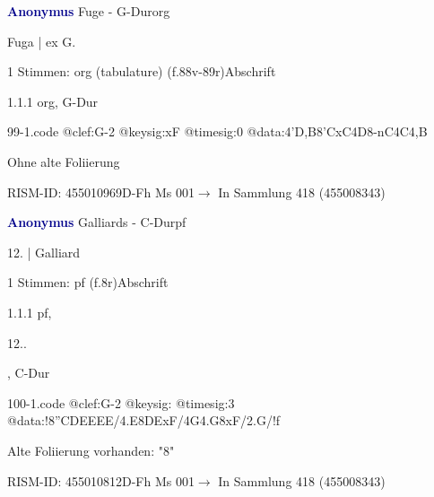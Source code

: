 \documentclass[twocolumn, 12pt]{book}
\begin{document}
\par \vspace{16pt} \textcolor{darkblue}{\textbf{Anonymus  }}\hfillplus{\textbf{[99]}}\newline Fuge - G-Dur\newline org
\par \begin{itshape}[f.88v, at left:] Fuga | ex G.\end{itshape} 
\par \textcolor{darkblue}{}  1 Stimmen: org (tabulature)  (f.88v-89r)\newline Abschrift
\par 1.1.1  org, G-Dur  
\begin{filecontents*}{99-1.code}
@clef:G-2
@keysig:xF
@timesig:0
@data:4'D,B{8'CxC}4D8-nC4C4,B
\end{filecontents*}
\newline %
\par Ohne alte Foliierung
\par RISM-ID: 455010969\newline D-Fh  Ms 001\newline $\rightarrow$ In Sammlung 418 (455008343)
      
\par \vspace{16pt} \textcolor{darkblue}{\textbf{Anonymus  }}\hfillplus{\textbf{[100]}}\newline Galliards - C-Dur\newline pf
\par \begin{itshape}[f.8r, at left:] 12. | Galliard\end{itshape} 
\par \textcolor{darkblue}{}  1 Stimmen: pf  (f.8r)\newline Abschrift
\par 1.1.1  pf, \begin{itshape}12..\end{itshape}, C-Dur  
\begin{filecontents*}{100-1.code}
@clef:G-2
@keysig:
@timesig:3
@data:!{8''CDEEEE}/4.E{8DExF}/4G4.G8xF/2.G/!f
\end{filecontents*}
\newline %
\par Alte Foliierung vorhanden: "8"
\par RISM-ID: 455010812\newline D-Fh  Ms 001\newline $\rightarrow$ In Sammlung 418 (455008343)
      
\end{document}
